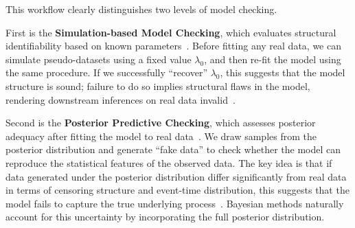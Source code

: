 This workflow clearly distinguishes two levels of model checking.

First is the \textbf{Simulation-based Model Checking}, which evaluates structural identifiability based on known parameters~\cite{10.1093/bioinformatics/btp358}. Before fitting any real data, we can simulate pseudo-datasets using a fixed value $\lambda_0$, and then re-fit the model using the same procedure. If we successfully “recover” $\lambda_0$, this suggests that the model structure is sound; failure to do so implies structural flaws in the model, rendering downstream inferences on real data invalid~\cite{10.1093/bioinformatics/btp358, pub.1044073403}.

Second is the \textbf{Posterior Predictive Checking}, which assesses posterior adequacy after fitting the model to real data~\cite{https://doi.org/10.1002/ecm.1314}. We draw samples from the posterior distribution and generate “fake data” to check whether the model can reproduce the statistical features of the observed data. The key idea is that if data generated under the posterior distribution differ significantly from real data in terms of censoring structure and event-time distribution, this suggests that the model fails to capture the true underlying process~\cite{62bfc978-09b1-3997-9776-380d0b45e9c2}. Bayesian methods naturally account for this uncertainty by incorporating the full posterior distribution.

